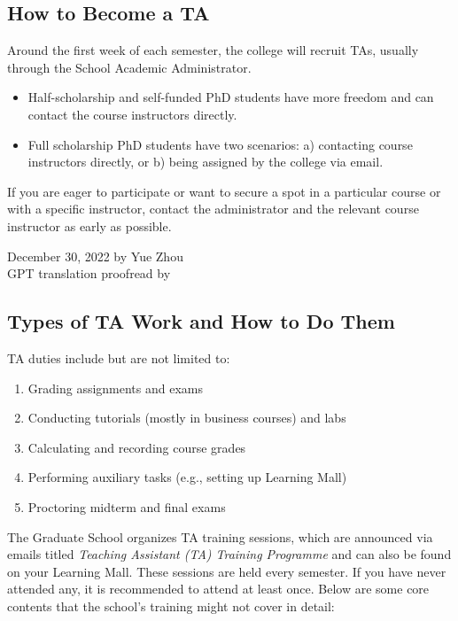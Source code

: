 \subsection{How to Become a TA}

Around the first week of each semester, the college will recruit TAs, usually through the School Academic Administrator.
\begin{itemize}
    \item Half-scholarship and self-funded PhD students have more freedom and can contact the course instructors directly.
    \item Full scholarship PhD students have two scenarios: a) contacting course instructors directly, or b) being assigned by the college via email.
\end{itemize}

If you are eager to participate or want to secure a spot in a particular course or with a specific instructor, contact the administrator and the relevant course instructor as early as possible.

\begin{flushright}
    December 30, 2022 by Yue Zhou \\
    GPT translation proofread by \Shiyao
\end{flushright}

\subsection{Types of TA Work and How to Do Them}

TA duties include but are not limited to:
\begin{enumerate}
    \item Grading assignments and exams
    \item Conducting tutorials (mostly in business courses) and labs
    \item Calculating and recording course grades
    \item Performing auxiliary tasks (e.g., setting up Learning Mall)
    \item Proctoring midterm and final exams
\end{enumerate}

The Graduate School organizes TA training sessions, which are announced via emails titled \textit{Teaching Assistant (TA) Training Programme} and can also be found on your Learning Mall. These sessions are held every semester. If you have never attended any, it is recommended to attend at least once. Below are some core contents that the school’s training might not cover in detail:

